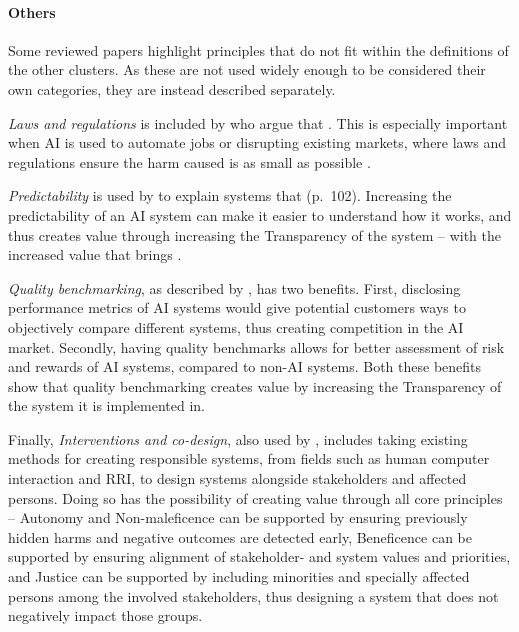 \paragraph{Others}
Some reviewed papers highlight principles that do not fit within the definitions of the other clusters. As these are not used widely enough to be considered their own categories, they are instead described separately.

\textit{Laws and regulations} is included by \textcite{Merhi_2022,Mikalef_2022} who argue that  \parencite[p.~259]{Mikalef_2022}. This is especially important when AI is used to automate jobs or disrupting existing markets, where laws and regulations ensure the harm caused is as small as possible \parencite{Mikalef_2022}.

\textit{Predictability} is used by \textcite{Vakkuri_2022} to explain systems that  (p.~102). Increasing the predictability of an AI system can make it easier to understand how it works, and thus creates value through increasing the Transparency of the system -- with the increased value that brings \parencite{Vakkuri_2022}.

\textit{Quality benchmarking}, as described by \textcite{Hacker_2022}, has two benefits. First, disclosing performance metrics of AI systems would give potential customers ways to objectively compare different systems, thus creating competition in the AI market. Secondly, having quality benchmarks allows for better assessment of risk and rewards of AI systems, compared to non-AI systems. Both these benefits show that quality benchmarking creates value by increasing the Transparency of the system it is implemented in.

Finally, \textit{Interventions and co-design}, also used by \textcite{Hacker_2022}, includes taking existing methods for creating responsible systems, from fields such as human computer interaction and RRI, to design systems alongside stakeholders and affected persons. Doing so has the possibility of creating value through all core principles -- Autonomy and Non-maleficence can be supported by ensuring previously hidden harms and negative outcomes are detected early, Beneficence can be supported by ensuring alignment of stakeholder- and system values and priorities, and Justice can be supported by including minorities and specially affected persons among the involved stakeholders, thus designing a system that does not negatively impact those groups.


